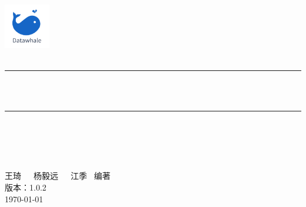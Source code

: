 
\begin{titlepage}
	\newcommand{\HRule}{\rule{\linewidth}{0.5mm}}
	\includegraphics[width=2cm]{res/logo_new.png}\\[1cm] 
	\center 
	\quad\\[1.5cm]
	
	\makeatletter
	\HRule \\[0.4cm]
	{ \huge \bfseries \@title}\\[0.4cm] 
	\HRule \\[1.5cm]
	\begin{minipage}{0.4\textwidth}
		\begin{flushleft} \large
		\end{flushleft}
	\end{minipage}
	~
	\begin{minipage}{0.4\textwidth}
		\begin{flushright} \large
		\end{flushright}
	\end{minipage}\\[3cm]
	\makeatother
    \vfill  %
	{\Large 王琦~~~杨毅远~~~江季 ~编著}\\[0.5cm]
    {\Large  版本：1.0.2}\\[0.5cm]
	{\Large \today}\\[2cm] 
	
\end{titlepage}

